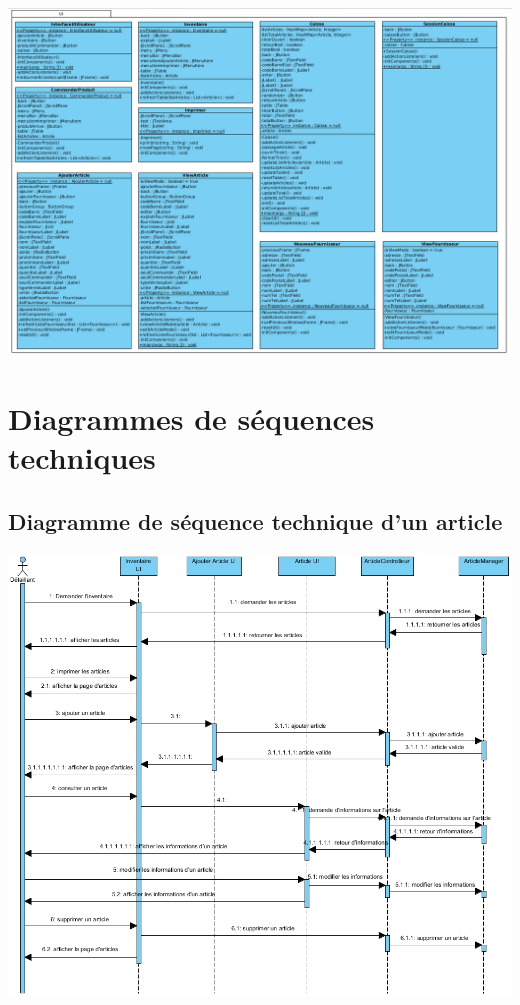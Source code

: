 \begin{center}
\includegraphics[width=14cm]{./Conception/ui}
\end{center}


\section{Diagrammes de séquences techniques}

\subsection{Diagramme de séquence technique d'un article}
\begin{center}
	\includegraphics[width=15cm]{./Conception/DiagrammedeSequenceArticles.jpg}
\end{center}

